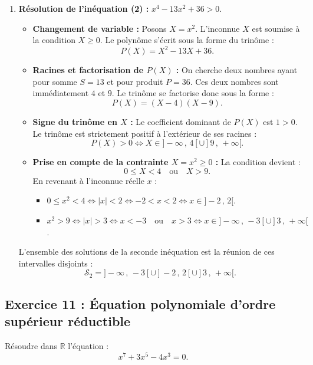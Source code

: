 \documentclass[11pt,a4paper]{article}
\newcommand{\R}{\mathbb{R}}
\begin{document}
\begin{correctionbox}
\begin{enumerate}
    \item \textbf{Résolution de l'inéquation (2) :} $x^4 - 13x^2 + 36 > 0$.
    \begin{itemize}
        \item \textbf{Changement de variable :} Posons $X = x^2$. L'inconnue $X$ est soumise à la condition $X \ge 0$.
        Le polynôme s'écrit sous la forme du trinôme :
        \[
        P(X) = X^2 - 13X + 36.
        \]
        \item \textbf{Racines et factorisation de $P(X)$ :}
        On cherche deux nombres ayant pour somme $S = 13$ et pour produit $P = 36$. Ces deux nombres sont immédiatement $4$ et $9$.
        Le trinôme se factorise donc sous la forme :
        \[
        P(X) = (X - 4)(X - 9).
        \]
        \item \textbf{Signe du trinôme en $X$ :}
        Le coefficient dominant de $P(X)$ est $1 > 0$. Le trinôme est strictement positif à l'extérieur de ses racines :
        \[
        P(X) > 0 \iff X \in ]-\infty\,,\, 4[ \cup ]9\,,\, +\infty[.
        \]
        \item \textbf{Prise en compte de la contrainte $X = x^2 \ge 0$ :}
        La condition devient :
        \[
        0 \le X < 4 \quad \text{ou} \quad X > 9.
        \]
        En revenant à l'inconnue réelle $x$ :
        \begin{itemize}
            \item $0 \le x^2 < 4 \iff |x| < 2 \iff -2 < x < 2 \iff x \in ]-2\,,\, 2[$.
            \item $x^2 > 9 \iff |x| > 3 \iff x < -3 \quad \text{ou} \quad x > 3 \iff x \in ]-\infty\,,\, -3[ \cup ]3\,,\, +\infty[$.
        \end{itemize}
    \end{itemize}
    L'ensemble des solutions de la seconde inéquation est la réunion de ces intervalles disjoints :
    \[
    \mathcal{S}_2 = ]-\infty\,,\, -3[ \cup ]-2\,,\, 2[ \cup ]3\,,\, +\infty[.
    \]
\end{enumerate}
\end{correctionbox}

\subsection*{Exercice 11 : Équation polynomiale d'ordre supérieur réductible}
Résoudre dans $\R$ l'équation :
\[
x^7 + 3x^5 - 4x^3 = 0.
\]
\end{document}

